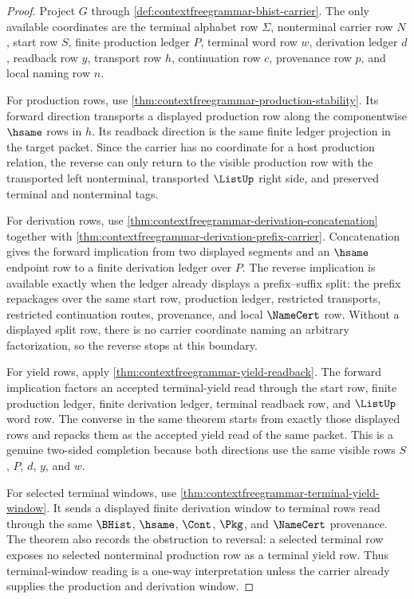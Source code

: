\begin{proof}
Project $G$ through \autoref{def:contextfreegrammar-bhist-carrier}. The only
available coordinates are the terminal alphabet row $\Sigma$, nonterminal
carrier row $N$, start row $S$, finite production ledger $P$, terminal word row
$w$, derivation ledger $d$, readback row $y$, transport row $h$, continuation
row $c$, provenance row $p$, and local naming row $n$.

For production rows, use
\autoref{thm:contextfreegrammar-production-stability}. Its forward direction
transports a displayed production row along the componentwise $\hsame$ rows in
$h$. Its readback direction is the same finite ledger projection in the target
packet. Since the carrier has no coordinate for a host production relation, the
reverse can only return to the visible production row with the transported left
nonterminal, transported $\ListUp$ right side, and preserved terminal and
nonterminal tags.

For derivation rows, use
\autoref{thm:contextfreegrammar-derivation-concatenation} together with
\autoref{thm:contextfreegrammar-derivation-prefix-carrier}. Concatenation gives
the forward implication from two displayed segments and an $\hsame$ endpoint
row to a finite derivation ledger over $P$. The reverse implication is available
exactly when the ledger already displays a prefix--suffix split: the prefix
repackages over the same start row, production ledger, restricted transports,
restricted continuation routes, provenance, and local $\NameCert$ row. Without
a displayed split row, there is no carrier coordinate naming an arbitrary
factorization, so the reverse stops at this boundary.

For yield rows, apply \autoref{thm:contextfreegrammar-yield-readback}. The
forward implication factors an accepted terminal-yield read through the start
row, finite production ledger, finite derivation ledger, terminal readback row,
and $\ListUp$ word row. The converse in the same theorem starts from exactly
those displayed rows and repacks them as the accepted yield read of the same
packet. This is a genuine two-sided completion because both directions use the
same visible rows $S$, $P$, $d$, $y$, and $w$.

For selected terminal windows, use
\autoref{thm:contextfreegrammar-terminal-yield-window}. It sends a displayed
finite derivation window to terminal rows read through the same $\BHist$,
$\hsame$, $\Cont$, $\Pkg$, and $\NameCert$ provenance. The theorem also records
the obstruction to reversal: a selected terminal row exposes no selected
nonterminal production row as a terminal yield row. Thus terminal-window reading
is a one-way interpretation unless the carrier already supplies the production
and derivation window.


\end{proof}
